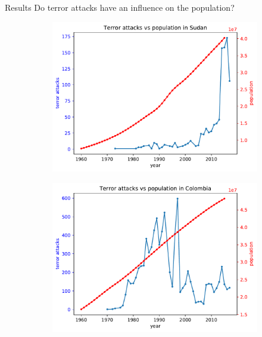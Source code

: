 \documentclass{beamer}
\begin{document}
\begin{frame}{Results}
	Do terror attacks have an influence on the population?
	
	\begin{figure}
		\begin{subfigure}[b]{0.315\textwidth}
			\includegraphics[width=\textwidth]{Population-Terror/attackVsPopulationSudan}
		\end{subfigure}
		\begin{subfigure}[b]{0.3\textwidth}
			\includegraphics[width=\textwidth]{Population-Terror/attackVsPopulationColombia}
		\end{subfigure}
		\begin{subfigure}[b]{0.3\textwidth}

\end{subfigure}
\end{figure}
\end{frame}
\end{document}
